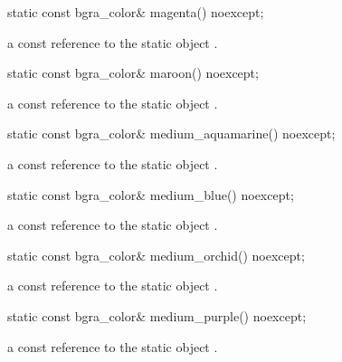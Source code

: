 \begin{itemdecl}
static const bgra_color& magenta() noexcept;
\end{itemdecl}
\begin{itemdescr}
\pnum
\returns
a const reference to the static  object .
\end{itemdescr}

\begin{itemdecl}
static const bgra_color& maroon() noexcept;
\end{itemdecl}
\begin{itemdescr}
\pnum
\returns
a const reference to the static  object .
\end{itemdescr}

\begin{itemdecl}
static const bgra_color& medium_aquamarine() noexcept;
\end{itemdecl}
\begin{itemdescr}
\pnum
\returns
a const reference to the static  object .
\end{itemdescr}

\begin{itemdecl}
static const bgra_color& medium_blue() noexcept;
\end{itemdecl}
\begin{itemdescr}
\pnum
\returns
a const reference to the static  object .
\end{itemdescr}

\begin{itemdecl}
static const bgra_color& medium_orchid() noexcept;
\end{itemdecl}
\begin{itemdescr}
\pnum
\returns
a const reference to the static  object .
\end{itemdescr}

\begin{itemdecl}
static const bgra_color& medium_purple() noexcept;
\end{itemdecl}
\begin{itemdescr}
\pnum
\returns
a const reference to the static  object .
\end{itemdescr}


